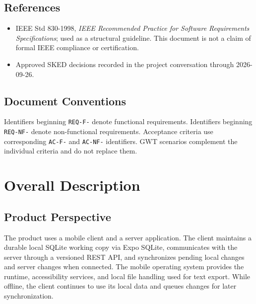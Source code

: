 \documentclass[11pt,a4paper]{article}
\begin{document}
\subsection{References}
\begin{itemize}
  \item IEEE Std 830-1998, \emph{IEEE Recommended Practice for Software Requirements Specifications}; used as a structural guideline. This document is not a claim of formal IEEE compliance or certification.
  \item Approved SKED decisions recorded in the project conversation through 2026-09-26.
\end{itemize}

\subsection{Document Conventions}
Identifiers beginning \texttt{REQ-F-} denote functional requirements. Identifiers beginning \texttt{REQ-NF-} denote non-functional requirements. Acceptance criteria use corresponding \texttt{AC-F-} and \texttt{AC-NF-} identifiers. GWT scenarios complement the individual criteria and do not replace them.

\section{Overall Description}

\subsection{Product Perspective}
The product uses a mobile client and a server application. The client maintains a durable local SQLite working copy via Expo SQLite, communicates with the server through a versioned REST API, and synchronizes pending local changes and server changes when connected. The mobile operating system provides the runtime, accessibility services, and local file handling used for text export. While offline, the client continues to use its local data and queues changes for later synchronization.
\end{document}
